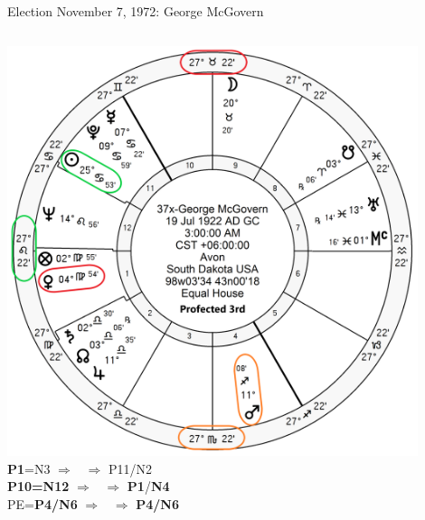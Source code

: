 \begin{frame}[t]{Election November 7, 1972: George McGovern}
\begin{columns}[T, onlytextwidth]
\vspace{-1em}
{\includegraphics[width=0.9\textwidth]{charts/McGovern-Prof-3rd.png}}
\fontsize{8pt}{9pt}\selectfont
\textbf{\dgreen P1}=N3
	$\Rightarrow$ \Sun\, $\Rightarrow$ P11/N2\\
\textbf{\red P10=N12}
	$\Rightarrow$ \Venus\, $\Rightarrow$ \textbf{\dgreen P1}/\textbf{\red N4}\\
PE=\textbf{\red P4/N6}
	 $\Rightarrow$ \Mars\, $\Rightarrow$ \textbf{\red P4/N6}

\end{columns}
\end{frame}
